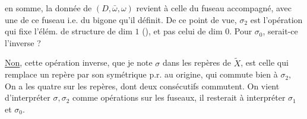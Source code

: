 en somme, la donnée de $(D,\bar\omega,\omega)$ revient à celle du fuseau accompagné, avec une  de ce fuseau i.e. du bigone qu'il définit.
De ce point de vue, $\sigma_2$ est l'opération qui fixe  l'élém. de structure  de dim $1$ (), et pas celui de dim $0$. Pour $\sigma_0$, serait-ce l'inverse ?

\uline{Non}, cette opération inverse,   que je note $\sigma$ dans les repères de $\widetilde X$, est celle qui remplace un repère par son symétrique p.r. au  origine, qui commute bien à $\sigma_2$,
On a les quatre 
sur les repères, dont deux consécutifs commutent. On vient d'interpréter $\sigma,\sigma_2$ comme opérations sur les fuseaux, il resterait à interpréter $\sigma_1$ et $\sigma_0$.

